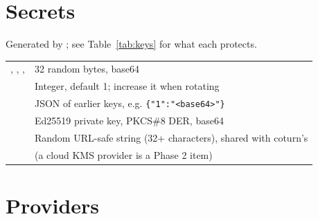 \section{Secrets}

Generated by ; see Table~\ref{tab:keys} for what each protects.

\begin{tabularx}{\linewidth}{@{}L{4.6cm}Y@{}}
\toprule
{} &  \\
\midrule
{}, , ,  & 32 random bytes, base64 \\
 & Integer, default 1; increase it when rotating \\
 & JSON of earlier keys, e.g. \texttt{\{"1":"<base64>"\}} \\
 & Ed25519 private key, PKCS\#8 DER, base64 \\
 & Random URL-safe string (32+ characters), shared with coturn's  \\
 &  (a cloud KMS provider is a Phase 2 item) \\
\bottomrule
\end{tabularx}

\section{Providers}

